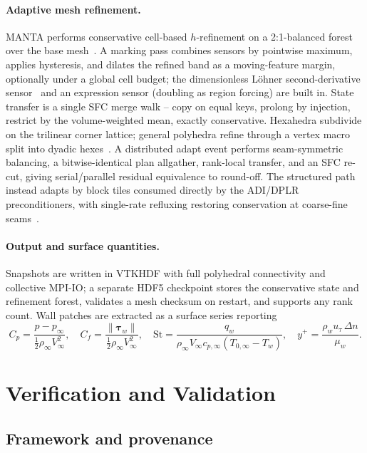 \documentclass[journal,biblatex]{new-aiaa}
\newcommand{\half}{\tfrac12}
\begin{document}
\paragraph{Adaptive mesh refinement.}
MANTA performs conservative cell-based $h$-refinement on a 2:1-balanced forest over the base mesh~\cite{berger_local_1989,burstedde_p4est_2011}. A marking pass combines sensors by pointwise maximum, applies hysteresis, and dilates the refined band as a moving-feature margin, optionally under a global cell budget; the dimensionless L\"ohner second-derivative sensor~\cite{lohner_adaptive_1987} and an expression sensor (doubling as region forcing) are built in. State transfer is a single SFC merge walk -- copy on equal keys, prolong by injection, restrict by the volume-weighted mean, exactly conservative. Hexahedra subdivide on the trilinear corner lattice; general polyhedra refine through a vertex macro split into dyadic hexes~\cite{catmull_recursively_1978}. A distributed adapt event performs seam-symmetric balancing, a bitwise-identical plan allgather, rank-local transfer, and an SFC re-cut, giving serial/parallel residual equivalence to round-off. The structured path instead adapts by block tiles consumed directly by the ADI/DPLR preconditioners, with single-rate refluxing restoring conservation at coarse-fine seams~\cite{grete_parthenonperformance_2023}.

\paragraph{Output and surface quantities.}
Snapshots are written in VTKHDF with full polyhedral connectivity and collective MPI-IO; a separate HDF5 checkpoint stores the conservative state and refinement forest, validates a mesh checksum on restart, and supports any rank count. Wall patches are extracted as a surface series reporting
\begin{equation}
C_p=\frac{p-p_\infty}{\half\rho_\infty V_\infty^2},\quad
C_f=\frac{\lVert\boldsymbol\tau_w\rVert}{\half\rho_\infty V_\infty^2},\quad
\mathrm{St}=\frac{q_w}{\rho_\infty V_\infty c_{p,\infty}(T_{0,\infty}-T_w)},\quad
y^+=\frac{\rho_w u_\tau\,\Delta n}{\mu_w}.
\end{equation}

\section{Verification and Validation}
\label{sec:vv}

\subsection{Framework and provenance}
\end{document}
